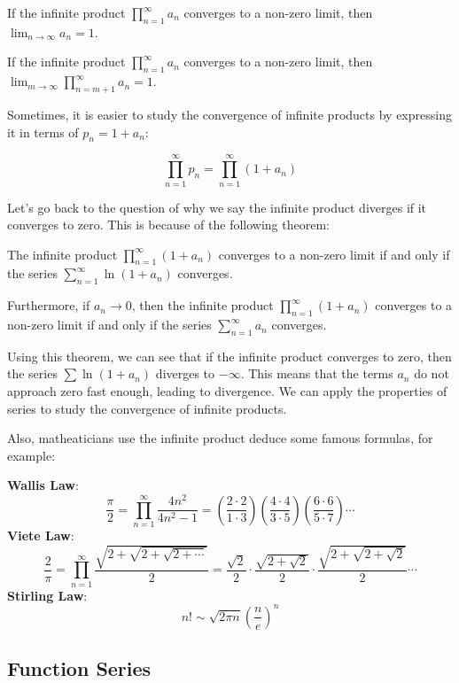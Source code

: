 \begin{theorem}
    If the infinite product $\prod_{n=1}^{\infty} a_n$ converges to a non-zero limit, then $\lim_{n \to \infty} a_n = 1$.
    
    If the infinite product $\prod_{n=1}^{\infty} a_n$ converges to a non-zero limit, then $\lim_{m \to \infty} \prod_{n=m+1}^{\infty} a_n = 1$.
\end{theorem}

Sometimes, it is easier to study the convergence of infinite products by expressing it in terms of $p_n = 1 + a_n$:

\[
\prod_{n=1}^{\infty} p_n = \prod_{n=1}^{\infty} (1 + a_n)
\]

Let's go back to the question of why we say the infinite product diverges if it converges to zero. This is because of the following theorem:

\begin{theorem}
    The infinite product $\prod_{n=1}^{\infty} (1 + a_n)$ converges to a non-zero limit if and only if the series $\sum_{n=1}^{\infty} \ln(1 + a_n)$ converges.
    
    Furthermore, if $a_n \to 0$, then the infinite product $\prod_{n=1}^{\infty} (1 + a_n)$ converges to a non-zero limit if and only if the series $\sum_{n=1}^{\infty} a_n$ converges.
\end{theorem}

Using this theorem, we can see that if the infinite product converges to zero, then the series $\sum \ln(1 + a_n)$ diverges to $-\infty$. This means that the terms $a_n$ do not approach zero fast enough, leading to divergence. We can apply the properties of series to study the convergence of infinite products.

Also, matheaticians use the infinite product deduce some famous formulas, for example:

\textbf{Wallis Law}:
\[\frac{\pi}{2} = \prod_{n=1}^{\infty} \frac{4n^2}{4n^2 - 1} = \left(\frac{2 \cdot 2}{1 \cdot 3}\right) \left(\frac{4 \cdot 4}{3 \cdot 5}\right) \left(\frac{6 \cdot 6}{5 \cdot 7}\right) \cdots\]
\textbf{Viete Law}:
\[\frac{2}{\pi} = \prod_{n=1}^{\infty} \frac{\sqrt{2 + \sqrt{2 + \sqrt{2 + \cdots}}}}{2} = \frac{\sqrt{2}}{2} \cdot \frac{\sqrt{2 + \sqrt{2}}}{2} \cdot \frac{\sqrt{2 + \sqrt{2 + \sqrt{2}}}}{2} \cdots\]
\textbf{Stirling Law}:
\[n! \sim \sqrt{2\pi n}\left(\frac{n}{e}\right)^n\]

\subsection{Function Series}

